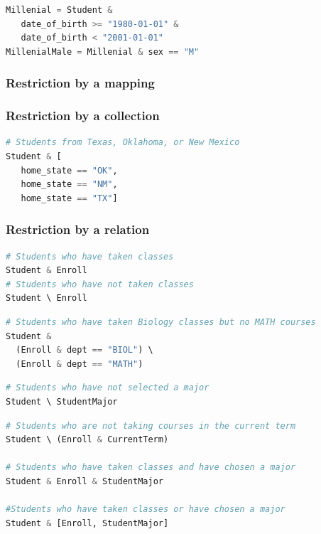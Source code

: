 \documentclass[letter,10pt]{article}
\begin{document}
\begin{lstlisting}[language=Python, caption={Assignment and use of relational variables.}, label={lst:res2}]
Millenial = Student & 
   date_of_birth >= "1980-01-01" & 
   date_of_birth < "2001-01-01"
MillenialMale = Millenial & sex == "M"
\end{lstlisting}

\subsubsection{Restriction by a mapping}

\subsubsection{Restriction by a collection}
\begin{lstlisting}[language=Python, caption={Restrictions by a collection of conditions.}, label={lst:res4}]
# Students from Texas, Oklahoma, or New Mexico
Student & [
   home_state == "OK", 
   home_state == "NM", 
   home_state == "TX"] 
\end{lstlisting}


\subsubsection{Restriction by a relation}
\begin{lstlisting}[language=Python]
# Students who have taken classes
Student & Enroll
# Students who have not taken classes
Student \ Enroll
\end{lstlisting}

\begin{lstlisting}[language=Python]
# Students who have taken Biology classes but no MATH courses
Student & 
  (Enroll & dept == "BIOL") \ 
  (Enroll & dept == "MATH")
\end{lstlisting}

\begin{lstlisting}[language=Python]
# Students who have not selected a major
Student \ StudentMajor
\end{lstlisting}

\begin{lstlisting}[language=Python]
# Students who are not taking courses in the current term
Student \ (Enroll & CurrentTerm)

# Students who have taken classes and have chosen a major
Student & Enroll & StudentMajor 

#Students who have taken classes or have chosen a major
Student & [Enroll, StudentMajor]
\end{lstlisting}
\end{document}
